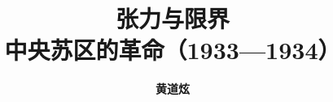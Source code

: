 \documentclass[a4paper, 12pt, openright]{ctexbook}
\begin{document}
\frontmatter

\title{\Huge \textbf{张力与限界}\\\Large 中央苏区的革命（1933—1934）}
\author{\textbf{黄道炫}}
\date{}

\maketitle



\tableofcontents

\mainmatter












\end{document}
